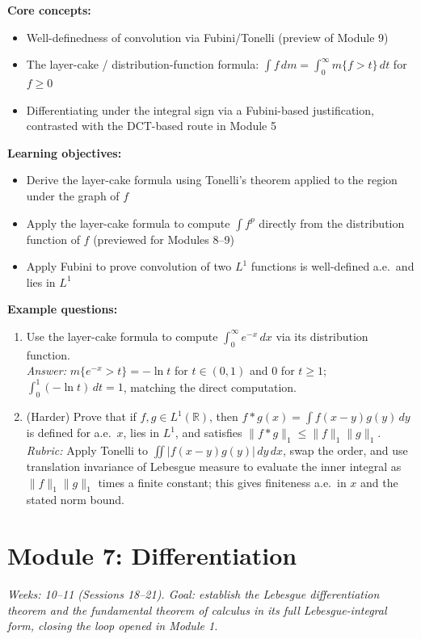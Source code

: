 \documentclass[11pt]{article}
\begin{document}
\textbf{Core concepts:}
\begin{itemize}[nosep]
\item Well-definedness of convolution via Fubini/Tonelli (preview of Module 9)
\item The layer-cake / distribution-function formula: $\int f\,dm=\int_0^\infty m\{f>t\}\,dt$ for $f\ge0$
\item Differentiating under the integral sign via a Fubini-based justification, contrasted with the DCT-based route in Module 5
\end{itemize}

\textbf{Learning objectives:}
\begin{itemize}[nosep]
\item Derive the layer-cake formula using Tonelli's theorem applied to the region under the graph of $f$
\item Apply the layer-cake formula to compute $\int f^p$ directly from the distribution function of $f$ (previewed for Modules 8--9)
\item Apply Fubini to prove convolution of two $L^1$ functions is well-defined a.e.\ and lies in $L^1$
\end{itemize}

\textbf{Example questions:}
\begin{enumerate}[nosep]
\item Use the layer-cake formula to compute $\int_0^\infty e^{-x}\,dx$ via its distribution function. \\
\textit{Answer:} $m\{e^{-x}>t\}=-\ln t$ for $t\in(0,1)$ and $0$ for $t\ge1$; $\int_0^1(-\ln t)\,dt=1$, matching the direct computation.
\item (Harder) Prove that if $f,g\in L^1(\mathbb{R})$, then $f*g(x)=\int f(x-y)g(y)\,dy$ is defined for a.e.\ $x$, lies in $L^1$, and satisfies $\|f*g\|_1\le\|f\|_1\|g\|_1$. \\
\textit{Rubric:} Apply Tonelli to $\iint|f(x-y)g(y)|\,dy\,dx$, swap the order, and use translation invariance of Lebesgue measure to evaluate the inner integral as $\|f\|_1\|g\|_1$ times a finite constant; this gives finiteness a.e.\ in $x$ and the stated norm bound.
\end{enumerate}

\section{Module 7: Differentiation}
\textit{Weeks: 10--11 (Sessions 18--21). Goal: establish the Lebesgue differentiation theorem and the fundamental theorem of calculus in its full Lebesgue-integral form, closing the loop opened in Module 1.}
\end{document}
